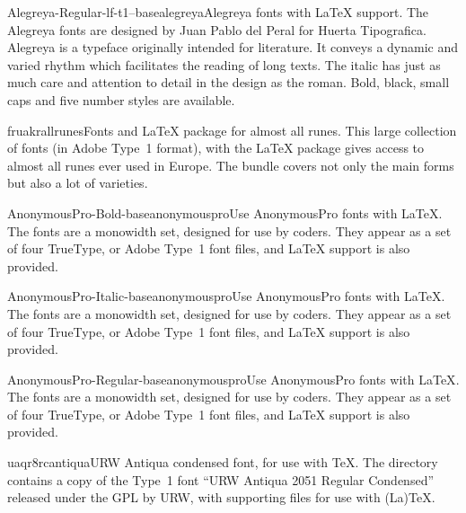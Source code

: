 \documentclass{ddltxtyp}
\begin{document}
\begin{package}{Alegreya-Regular-lf-t1--base}{alegreya}{Alegreya fonts with {\LaTeX} support.}
The Alegreya fonts are designed by Juan Pablo del Peral for
Huerta Tipografica. Alegreya is a typeface originally intended
for literature. It conveys a dynamic and varied rhythm which
facilitates the reading of long texts. The italic has just as
much care and attention to detail in the design as the roman.
Bold, black, small caps and five number styles are available.
\end{package}

\begin{package}{fruakr}{allrunes}{Fonts and {\LaTeX} package for almost all runes.}
This large collection of fonts (in Adobe Type~1 format), with
the {\LaTeX} package gives access to almost all runes ever used in
Europe. The bundle covers not only the main forms but also a
lot of varieties.
\end{package}

\begin{package}{AnonymousPro-Bold-base}{anonymouspro}{Use AnonymousPro fonts with {\LaTeX}.}
The fonts are a monowidth set, designed for use by coders. They
appear as a set of four TrueType, or Adobe Type~1 font files,
and {\LaTeX} support is also provided.
\end{package}
\begin{package}{AnonymousPro-Italic-base}{anonymouspro}{Use AnonymousPro fonts with {\LaTeX}.}
The fonts are a monowidth set, designed for use by coders. They
appear as a set of four TrueType, or Adobe Type~1 font files,
and {\LaTeX} support is also provided.
\end{package}
\begin{package}{AnonymousPro-Regular-base}{anonymouspro}{Use AnonymousPro fonts with {\LaTeX}.}
The fonts are a monowidth set, designed for use by coders. They
appear as a set of four TrueType, or Adobe Type~1 font files,
and {\LaTeX} support is also provided.
\end{package}

\begin{package}{uaqr8rc}{antiqua}{URW Antiqua condensed font, for use with {\TeX}.}
The directory contains a copy of the Type~1 font ``URW Antiqua
2051 Regular Condensed'' released under the GPL by URW, with
supporting files for use with (La){\TeX}.
\end{package}
\end{document}
